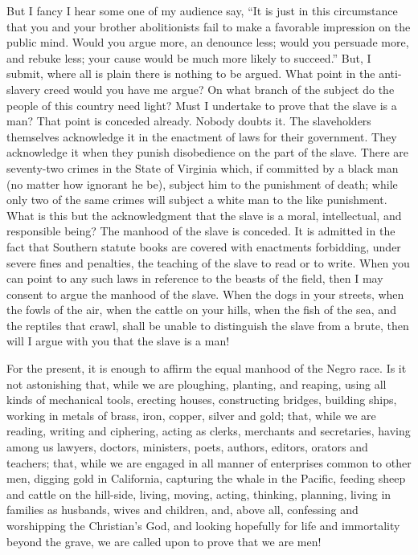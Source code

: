 \documentclass[a4paper]{amsbook}
\begin{document}
But I fancy I hear some one of my audience say, “It is just in this circumstance that you and your brother abolitionists fail to make a favorable impression on the public mind. Would you argue more, an denounce less; would you persuade more, and rebuke less; your cause would be much more likely to succeed.” But, I submit, where all is plain there is nothing to be argued. What point in the anti-slavery creed would you have me argue? On what branch of the subject do the people of this country need light? Must I undertake to prove that the slave is a man? That point is conceded already. Nobody doubts it. The slaveholders themselves acknowledge it in the enactment of laws for their government. They acknowledge it when they punish disobedience on the part of the slave. There are seventy-two crimes in the State of Virginia which, if committed by a black man (no matter how ignorant he be), subject him to the punishment of death; while only two of the same crimes will subject a white man to the like punishment. What is this but the acknowledgment that the slave is a moral, intellectual, and responsible being? The manhood of the slave is conceded. It is admitted in the fact that Southern statute books are covered with enactments forbidding, under severe fines and penalties, the teaching of the slave to read or to write. When you can point to any such laws in reference to the beasts of the field, then I may consent to argue the manhood of the slave. When the dogs in your streets, when the fowls of the air, when the cattle on your hills, when the fish of the sea, and the reptiles that crawl, shall be unable to distinguish the slave from a brute, then will I argue with you that the slave is a man!

For the present, it is enough to affirm the equal manhood of the Negro race. Is it not astonishing that, while we are ploughing, planting, and reaping, using all kinds of mechanical tools, erecting houses, constructing bridges, building ships, working in metals of brass, iron, copper, silver and gold; that, while we are reading, writing and ciphering, acting as clerks, merchants and secretaries, having among us lawyers, doctors, ministers, poets, authors, editors, orators and teachers; that, while we are engaged in all manner of enterprises common to other men, digging gold in California, capturing the whale in the Pacific, feeding sheep and cattle on the hill-side, living, moving, acting, thinking, planning, living in families as husbands, wives and children, and, above all, confessing and worshipping the Christian's God, and looking hopefully for life and immortality beyond the grave, we are called upon to prove that we are men!
\end{document}
